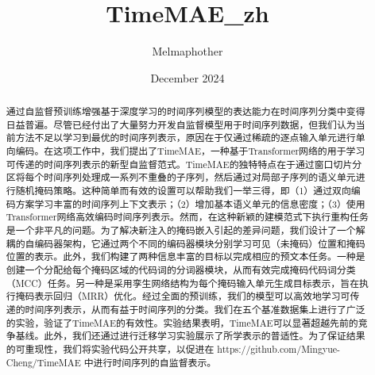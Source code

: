 \documentclass[a4paper,12pt]{article}
\title{TimeMAE\_zh}
\author{Melmaphother}
\date{December 2024}
\begin{document}
\maketitle
{}
\tableofcontents
\newpage
\begin{abstract}
通过自监督预训练增强基于深度学习的时间序列模型的表达能力在时间序列分类中变得日益普遍。尽管已经付出了大量努力开发自监督模型用于时间序列数据，但我们认为当前方法不足以学习到最优的时间序列表示，原因在于仅通过稀疏的逐点输入单元进行单向编码。在这项工作中，我们提出了TimeMAE，一种基于Transformer网络的用于学习可传递的时间序列表示的新型自监督范式。TimeMAE的独特特点在于通过窗口切片分区将每个时间序列处理成一系列不重叠的子序列，然后通过对局部子序列的语义单元进行随机掩码策略。这种简单而有效的设置可以帮助我们一举三得，即（1）通过双向编码方案学习丰富的时间序列上下文表示；（2）增加基本语义单元的信息密度；（3）使用Transformer网络高效编码时间序列表示。然而，在这种新颖的建模范式下执行重构任务是一个非平凡的问题。为了解决新注入的掩码嵌入引起的差异问题，我们设计了一个解耦的自编码器架构，它通过两个不同的编码器模块分别学习可见（未掩码）位置和掩码位置的表示。此外，我们构建了两种信息丰富的目标以完成相应的预文本任务。一种是创建一个分配给每个掩码区域的代码词的分词器模块，从而有效完成掩码代码词分类（MCC）任务。另一种是采用孪生网络结构为每个掩码输入单元生成目标表示，旨在执行掩码表示回归（MRR）优化。经过全面的预训练，我们的模型可以高效地学习可传递的时间序列表示，从而有益于时间序列的分类。我们在五个基准数据集上进行了广泛的实验，验证了TimeMAE的有效性。实验结果表明，TimeMAE可以显著超越先前的竞争基线。此外，我们还通过进行迁移学习实验展示了所学表示的普适性。为了保证结果的可重现性，我们将实验代码公开共享，以促进在 https://github.com/Mingyue-Cheng/TimeMAE 中进行时间序列的自监督表示。
\end{abstract}
\end{document}
